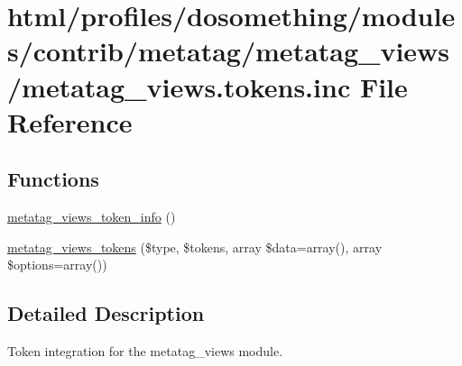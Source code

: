\hypertarget{metatag__views_8tokens_8inc}{
\section{html/profiles/dosomething/modules/contrib/metatag/metatag\_\-views/metatag\_\-views.tokens.inc File Reference}
\label{metatag__views_8tokens_8inc}
}
\subsection*{Functions}
\begin{DoxyCompactItemize}
\item 
\hyperlink{metatag__views_8tokens_8inc_a8e88403fb36cbef254723b3c734d1cc0}{metatag\_\-views\_\-token\_\-info} ()
\item 
\hyperlink{metatag__views_8tokens_8inc_a1c0a87f4f1fc2e98bebe62e909b4affa}{metatag\_\-views\_\-tokens} (\$type, \$tokens, array \$data=array(), array \$options=array())
\end{DoxyCompactItemize}


\subsection{Detailed Description}
Token integration for the metatag\_\-views module. 

